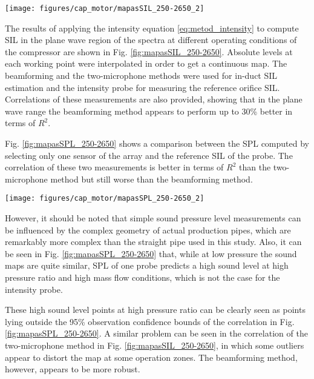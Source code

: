 \begin{figure*}[b!]
\hspace{-0.06\textwidth}
\texttt{[image: figures/cap\_motor/mapasSIL\_250-2650\_2]}
\caption{In duct SIL maps of the compressor noise estimated by the beamforming method (top left), two microphone method (top right) and SIL map of orifice noise as measured by the probe (top center), including correlations between the three measurements (bottom).}
\label{fig:mapasSIL_250-2650}
\end{figure*}

The results of applying the intensity equation \ref{eq:metod_intensity} to compute SIL in the plane wave region of the spectra at different operating conditions of the compressor are shown in Fig. \ref{fig:mapasSIL_250-2650}. Absolute levels at each working point were interpolated in order to get a continuous map. The beamforming and the two-microphone methods were used for in-duct SIL estimation and the intensity probe for measuring the reference orifice SIL. Correlations of these measurements are also provided, showing that in the plane wave range the beamforming method appears to perform up to 30\% better in terms of $R^2$.

Fig. \ref{fig:mapasSPL_250-2650} shows a comparison between the SPL computed by selecting only one sensor of the array and the reference SIL of the probe. The correlation of these two measurements is better in terms of $R^2$ than the two-microphone method but still worse than the beamforming method.

\begin{figure*}[tb!]
\centering
\texttt{[image: figures/cap\_motor/mapasSPL\_250-2650\_2]}
\caption{Comparison of compressor sound maps (plane wave region) obtained through interpolation of SPL at the inlet 1st sensor and SIL at the probe, including a correlation between both.}
\label{fig:mapasSPL_250-2650}
\end{figure*}

However, it should be noted that simple sound pressure level measurements can be influenced by the complex geometry of actual production pipes, which are remarkably more complex than the straight pipe used in this study. Also, it can be seen in Fig. \ref{fig:mapasSPL_250-2650} that, while at low pressure the sound maps are quite similar, SPL of one probe predicts a high sound level at high pressure ratio and high mass flow conditions, which is not the case for the intensity probe.

These high sound level points at high pressure ratio can be clearly seen as points lying outside the 95\% observation confidence bounds of the correlation in Fig. \ref{fig:mapasSPL_250-2650}. A similar problem can be seen in the correlation of the two-microphone method in Fig. \ref{fig:mapasSIL_250-2650}, in which some outliers appear to distort the map at some operation zones. The beamforming method, however, appears to be more robust.

